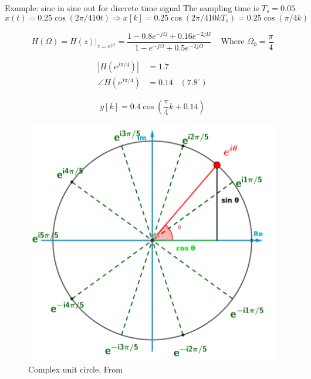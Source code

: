 \begin{exampleblock}{Example: sine in sine out for discrete time signal}
    The sampling time is $T_s = 0.05$ 
    \begin{equation*}
        x(t) = 0.25\cos(2\pi/4 10 t) \Rightarrow x[k] = 0.25\cos(2\pi/4 10 k T_s) = 0.25\cos(\pi/4 k)
    \end{equation*}

    \begin{equation*}
        H(\Omega) = H(z)|_{z=e^{j\Omega}} = \frac{ 1 -0.8e^{-j\Omega} +0.16e^{-2j\Omega} }{ 1 -e^{-j\Omega} +0.5e^{-2j\Omega} } \;\;\; \text{ Where } \Omega_0 = \frac{\pi}{4}
    \end{equation*}

    \begin{align*}
        |H(e^{j\pi/4})| &= 1.7  \\
        \angle H(e^{j\pi/4}) &= 0.14 \;\;\; (7.8^{\circ})
    \end{align*}

    \begin{equation*}
        y[k] = 0.4\cos(\frac{\pi}{4}k + 0.14)
    \end{equation*}
\end{exampleblock}
    

\begin{appendices}

\begin{figure}[H]
   \centering
   \includegraphics[width=12cm]{image/complex_unit_circle.png} 
   \caption{Complex unit circle. From \cite{st}}
   \label{fig:complex_unit_circle}
\end{figure}
\end{appendices}